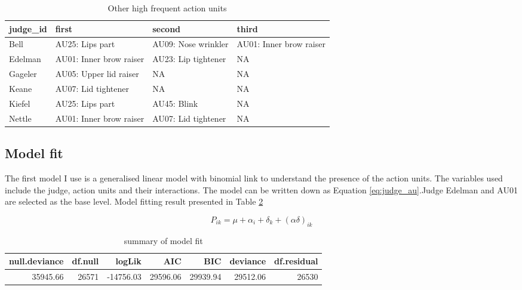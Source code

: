 \documentclass{monashthesis}
\begin{document}
\begin{table}[t]

\caption{\label{tab:unnamed-chunk-7}\label{tab:other_highf} Other high frequent action units }
\centering
\begin{tabular}{l|l|l|l}
\hline
judge\_id & first & second & third\\
\hline
Bell & AU25: Lips part & AU09: Nose wrinkler & AU01: Inner brow raiser\\
\hline
Edelman & AU01: Inner brow raiser & AU23: Lip tightener & NA\\
\hline
Gageler & AU05: Upper lid raiser & NA & NA\\
\hline
Keane & AU07: Lid tightener & NA & NA\\
\hline
Kiefel & AU25: Lips part & AU45: Blink & NA\\
\hline
Nettle & AU01: Inner brow raiser & AU07: Lid tightener & NA\\
\hline
\end{tabular}
\end{table}

\hypertarget{model-fit}{%
\subsection{Model fit}\label{model-fit}}

The first model I use is a generalised linear model with binomial link to understand the presence of the action units. The variables used include the judge, action units and their interactions. The model can be written down as Equation \ref{eq:judge_au}.Judge Edelman and AU01 are selected as the base level. Model fitting result presented in Table \ref{tab:glance_1}

\begin{equation}\label{eq:judge_au}
P_{ik} = \mu + \alpha_i + \delta_k + (\alpha\delta)_{ik}
\end{equation}

\begin{table}[t]

\caption{\label{tab:unnamed-chunk-8}\label{tab:glance_1}summary of model fit}
\centering
\begin{tabular}{r|r|r|r|r|r|r}
\hline
null.deviance & df.null & logLik & AIC & BIC & deviance & df.residual\\
\hline
35945.66 & 26571 & -14756.03 & 29596.06 & 29939.94 & 29512.06 & 26530\\
\hline
\end{tabular}
\end{table}
\end{document}
